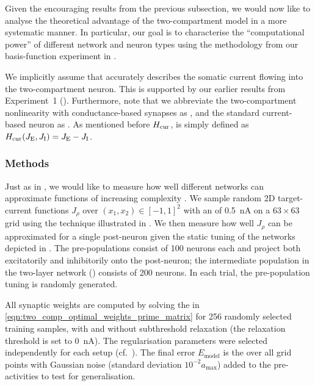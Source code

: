 Given the encouraging results from the previous subsection, we would now like to analyse the theoretical advantage of the two-compartment \LIF model in a more systematic manner.
In particular, our goal is to characterise the \enquote{computational power} of different network and neuron types using the methodology from our basis-function experiment in .

We implicitly assume that \Hcond accurately describes the somatic current flowing into the two-compartment neuron.
This is supported by our earlier results from Experiment~1 ().
Furthermore, note that we abbreviate the two-compartment \LIF nonlinearity with conductance-based synapses as \Hcond, and the standard current-based \LIF neuron as \Hcur.
As mentioned before ${H_\mathrm{cur}}$, is simply defined as ${H_\mathrm{cur}}(J_\mathrm{E}, J_\mathrm{I}) = J_\mathrm{E} - J_\mathrm{I}$.

\subsubsection{Methods}
Just as in , we would like to measure how well different networks can approximate functions of increasing complexity \slc.
We sample random 2D target-current functions $J_\rho$ over $(x_1, x_2) \in [-1, 1]^2$ with an \RMS of \SI{0.5}{\nano\ampere} on a $63 \times 63$ grid using the technique illustrated in .
We then measure how well $J_\rho$ can be approximated for a single post-neuron given the static tuning of the networks depicted in .
The pre-populations consist of \num{100} neurons each and project both excitatorily and inhibitorily onto the post-neuron; the intermediate population in the two-layer network () consists of \num{200} neurons.
In each trial, the pre-population tuning is randomly generated.

All synaptic weights are computed by solving the \QP in \cref{eqn:two_comp_optimal_weights_prime_matrix} for 256 randomly selected training samples, with and without subthreshold relaxation (the relaxation threshold is set to \SI{0}{\nano\ampere}).
The regularisation parameters were selected independently for each setup (cf.~).
The final error $E_\mathrm{model}$ is the \NRMSE over all grid points with Gaussian noise (standard deviation $10^{-2} a_\mathrm{max}$) added to the pre-activities to test for generalisation.

